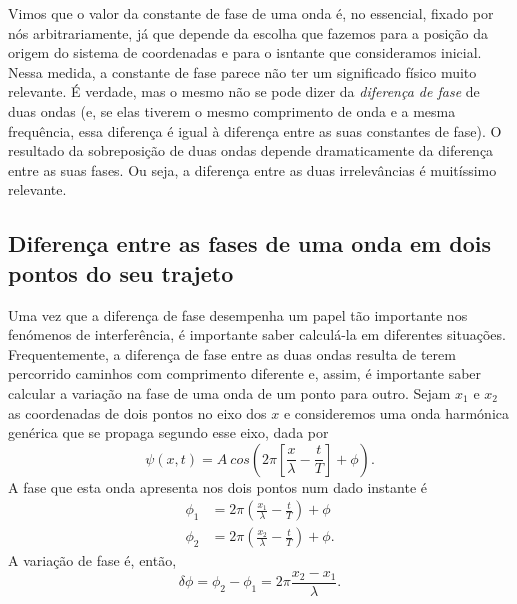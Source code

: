 Vimos que o valor da constante de fase de uma onda é, no essencial, fixado
por nós arbitrariamente, já que depende da escolha que fazemos para a posição da
origem do sistema de coordenadas e para o isntante que consideramos inicial.
Nessa medida, a constante de fase parece não ter um significado físico muito
relevante. É verdade, mas o mesmo não se pode dizer da \emph{diferença de fase}
de duas ondas (e, se elas tiverem o mesmo comprimento de onda e a mesma
frequência, essa diferença é igual à diferença entre as suas constantes de
fase). O resultado da sobreposição de duas ondas depende dramaticamente da
diferença entre as suas fases. Ou seja, a diferença entre as duas irrelevâncias
é muitíssimo relevante.

\subsection{Diferença entre as fases de uma onda em dois pontos do seu trajeto}
\label{sec:dfidx}
Uma vez que a diferença de fase desempenha um papel tão importante nos fenómenos
de interferência, é importante saber calculá-la em diferentes situações.
Frequentemente, a diferença de fase entre as duas ondas resulta de terem
percorrido caminhos com comprimento diferente e, assim, é importante saber
calcular a variação na fase de uma onda de um ponto para outro. 
Sejam $x_1$ e $x_2$ as coordenadas de dois pontos no eixo dos $x$ e consideremos
uma onda harmónica genérica que se propaga segundo esse eixo, dada por
\begin{equation*}
\psi(x,t)=A\
    cos\left(2\pi\left[\frac{x}{\lambda}-\frac{t}{T}\right]+\phi\right).
\end{equation*}
A fase que esta onda apresenta nos dois pontos num dado instante é
\begin{align*}
\phi_1&=2\pi\left(\frac{x_1}{\lambda}-\frac{t}{T}\right)+\phi\\
\phi_2&=2\pi\left(\frac{x_2}{\lambda}-\frac{t}{T}\right)+\phi.
\end{align*}
A variação de fase é, então,
\begin{equation*}
\delta\phi=\phi_2-\phi_1=2\pi\frac{x_2-x_1}{\lambda}.
\end{equation*}


